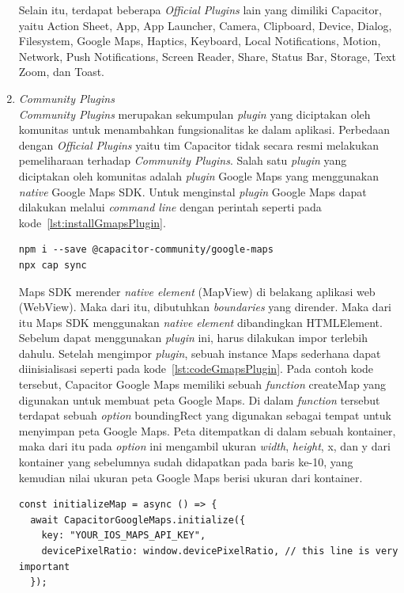 \begin{enumerate}
\begin{enumerate}
		\end{enumerate}				
		
		Selain itu, terdapat beberapa \textit{Official Plugins} lain yang dimiliki Capacitor, yaitu Action Sheet, App, App Launcher, Camera, Clipboard, Device, Dialog, Filesystem, Google Maps, Haptics, Keyboard, Local Notifications, Motion, Network, Push Notifications, Screen Reader, Share, Status Bar, Storage, Text Zoom, dan Toast.
		\newpage
	\item \textit{Community Plugins} \\
		\textit{Community Plugins} merupakan sekumpulan \textit{plugin} yang diciptakan oleh komunitas untuk menambahkan fungsionalitas ke dalam aplikasi. Perbedaan dengan \textit{Official Plugins} yaitu tim Capacitor tidak secara resmi melakukan pemeliharaan terhadap \textit{Community Plugins}. Salah satu \textit{plugin} yang diciptakan oleh komunitas adalah \textit{plugin }Google Maps yang menggunakan \textit{native} Google Maps SDK. Untuk menginstal \textit{plugin} Google Maps dapat dilakukan melalui \textit{command line} dengan perintah seperti pada kode~\ref{lst:installGmapsPlugin}.	
		
\begin{lstlisting}[label={lst:installGmapsPlugin}, caption=Kode untuk Menginstal \textit{Plugin} Google Maps]
npm i --save @capacitor-community/google-maps
npx cap sync
\end{lstlisting}

	Maps SDK merender \textit{native element} (MapView) di belakang aplikasi web (WebView). Maka dari itu, dibutuhkan \textit{boundaries} yang dirender. Maka dari itu Maps SDK menggunakan \textit{native element} dibandingkan HTMLElement. Sebelum dapat menggunakan \textit{plugin} ini, harus dilakukan impor terlebih dahulu. Setelah mengimpor \textit{plugin}, sebuah instance Maps sederhana dapat diinisialisasi seperti pada kode~\ref{lst:codeGmapsPlugin}. Pada contoh kode tersebut, Capacitor Google Maps memiliki sebuah \textit{function} createMap yang digunakan untuk membuat peta Google Maps. Di dalam \textit{function} tersebut terdapat sebuah \textit{option} boundingRect yang digunakan sebagai tempat untuk menyimpan peta Google Maps. Peta ditempatkan di dalam sebuah kontainer, maka dari itu pada \textit{option} ini mengambil ukuran \textit{width}, \textit{height}, x, dan y dari kontainer yang sebelumnya sudah didapatkan pada baris ke-10, yang kemudian nilai ukuran peta Google Maps berisi ukuran dari kontainer.
	
\begin{lstlisting}[label={lst:codeGmapsPlugin}, caption=Contoh Kode Penggunaan \textit{Plugin} Google Maps]
const initializeMap = async () => {
  await CapacitorGoogleMaps.initialize({
    key: "YOUR_IOS_MAPS_API_KEY",
    devicePixelRatio: window.devicePixelRatio, // this line is very important
  });


\end{lstlisting}
\end{enumerate}
